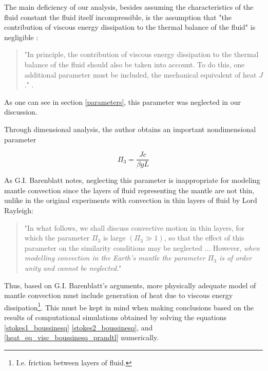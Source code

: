 The main deficiency of our analysis, besides assuming the characteristics of the fluid constant the fluid itself incompressible, is the assumption that "the contribution of viscous energy dissipation to the thermal balance of the fluid" is negligible \cite[p. 545]{boussinesq_validity}:

\begin{quote} 

"In principle, the contribution of viscous energy dissipation to the thermal balance of the fluid should also be taken into account. To do this, one additional parameter must be included, the mechanical equivalent of heat $J$." \cite[p. 45]{barenblatt1}.

\end{quote}


As one can see in section \ref{parameters}, this parameter was neglected in our discussion.

Through dimensional analysis, the author obtains an important nondimensional parameter \cite[p. 46]{barenblatt1}

$$ \Pi_3 = \frac{Jc}{\beta g L} $$

As G.I. Barenblatt notes, neglecting this parameter is inappropriate for modeling mantle convection since the layers of fluid representing the mantle are not thin, unlike in the original experiments with convection in thin layers of fluid by Lord Rayleigh:

\begin{quote} 

"In what follows, we shall discuss convective motion in thin layers, for which the parameter $\Pi_3$ is large $(\Pi_3 \gg 1)$, so that the effect of this parameter on the similarity conditions may be neglected ... However, \emph{when modelling convection in the Earth's mantle the parameter $\Pi_3$ is of order unity and cannot be neglected}." \cite[pp. 46-47]{barenblatt1} 

\end{quote}

Thus, based on G.I. Barenblatt's arguments, more physically adequate model of mantle convection must include generation of heat due to viscous energy dissipation\footnote{I.e. friction between layers of fluid.}. This must be kept in mind when making conclusions based on the results of computational simulations obtained by solving the equations \ref{stokes1_boussinesq} \ref{stokes2_boussinesq}, and \ref{heat_eq_visc_boussinesq_prandtl} numerically. \cite[cf. p. 772 for the discussion of the importance of viscous dissipation in mantle convection]{mantle_conv_in_earth_and_planets}


